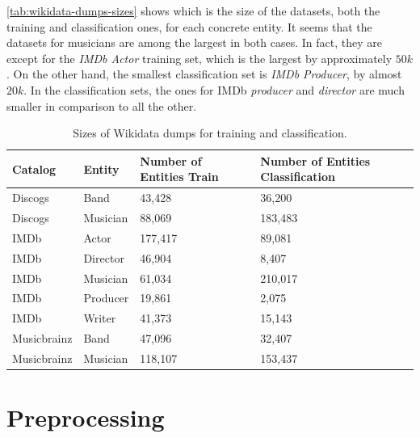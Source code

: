 \documentclass[epsfig,a4paper,11pt,titlepage,twoside,openany]{book}
\begin{document}
\autoref{tab:wikidata-dumps-sizes} shows which is the size of the datasets, both the training and classification ones, for each concrete entity. It seems that the datasets for musicians are among the largest in both cases. In fact, they are except for the \textit{IMDb Actor} training set, which is the largest by approximately $50k$. On the other hand, the smallest classification set is \textit{IMDb Producer}, by almost $20k$. In the classification sets, the ones for IMDb \textit{producer} and \textit{director} are much smaller in comparison to all the other. 

\begin{table}[H]
\centering
\begin{tabular}{l|l|l|l}
\textbf{Catalog}     & \textbf{Entity}   & \textbf{Number of Entities Train} & \textbf{Number of Entities Classification} \\ \hline
Discogs     & Band     & 43,428                   & 36,200                            \\ \hline
Discogs     & Musician & 88,069                   & 183,483                           \\ \hline
IMDb        & Actor    & 177,417                  & 89,081                            \\ \hline
IMDb        & Director & 46,904                   & 8,407                             \\ \hline
IMDb        & Musician & 61,034                   & 210,017                           \\ \hline
IMDb        & Producer & 19,861                   & 2,075                             \\ \hline
IMDb        & Writer   & 41,373                   & 15,143                            \\ \hline
Musicbrainz & Band     & 47,096                   & 32,407                            \\ \hline
Musicbrainz & Musician & 118,107                  & 153,437                           \\ \hline
\end{tabular}
\caption{Sizes of Wikidata dumps for training and classification.}
\label{tab:wikidata-dumps-sizes}
\end{table}



\section{Preprocessing}
\label{sec:data-preprocessing}
\end{document}
